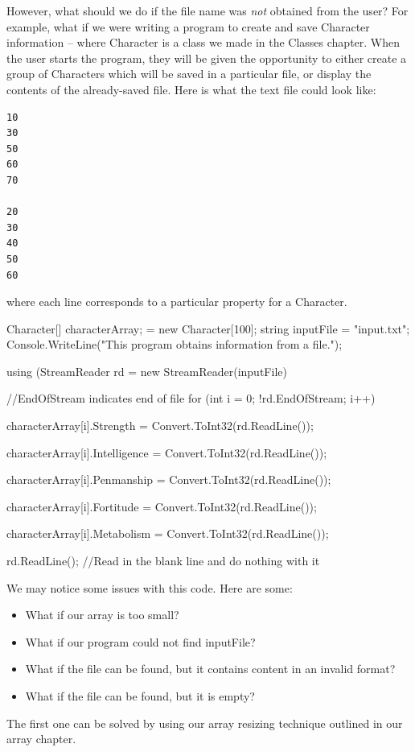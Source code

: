 \documentclass[oneside, openany] {book}
\begin{document}
However, what should we do if the file name was \emph{not} obtained from the user? For example, what if we were writing a program to create and save Character information -- where Character is a class we made in the Classes chapter. When the user starts the program, they will be given the opportunity to either create a group of Characters which will be saved in a particular file, or display the contents of the already-saved file. 
Here is what the text file could look like:
\begin{verbatim}
10
30
50
60
70

20
30
40
50
60
\end{verbatim}

where each line corresponds to a particular property for a Character.


\begin{CSharp}
Character[] characterArray; = new Character[100];
string inputFile = "input.txt";
Console.WriteLine("This program obtains information from a file.");

using (StreamReader rd = new StreamReader(inputFile)
{
//EndOfStream indicates end of file
for (int i = 0; !rd.EndOfStream; i++)
    {
      characterArray[i].Strength = Convert.ToInt32(rd.ReadLine());
      
      characterArray[i].Intelligence = Convert.ToInt32(rd.ReadLine());
      
      characterArray[i].Penmanship = Convert.ToInt32(rd.ReadLine());
      
      characterArray[i].Fortitude = Convert.ToInt32(rd.ReadLine());
      
      characterArray[i].Metabolism = Convert.ToInt32(rd.ReadLine());
      
      rd.ReadLine(); //Read in the blank line and do nothing with it
    }
}
\end{CSharp}
We may notice some issues with this code. Here are some:
\begin{itemize}
    \item What if our array is too small?
    \item What if our program could not find inputFile?
    \item What if the file can be found, but it contains content in an invalid format?
    \item What if the file can be found, but it is empty?
\end{itemize}
The first one can be solved by using our array resizing technique outlined in our array chapter.
\end{document}
